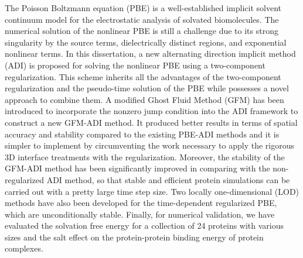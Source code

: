 The Poisson Boltzmann equation (PBE) is a well-established implicit solvent continuum model for the electrostatic analysis of solvated biomolecules. The numerical solution of the nonlinear PBE is still a challenge due to its strong singularity by the source terms, dielectrically distinct regions, and exponential nonlinear terms. In this dissertation, a new alternating direction implicit method (ADI) is proposed for solving the nonlinear PBE using a two-component regularization. This scheme inherits all the advantages of the two-component regularization and the pseudo-time solution of the PBE while possesses a novel approach to combine them. A modified Ghost Fluid Method (GFM) has been introduced to incorporate the nonzero jump condition into the ADI framework to construct a new GFM-ADI method. It produced better results in terms of  spatial accuracy and stability compared to the existing PBE-ADI methods and it is simpler to implement by circumventing the work necessary to apply the rigorous 3D interface treatments with the regularization. Moreover, the stability of the GFM-ADI method has been significantly improved in comparing with the non-regularized ADI method, so that stable and efficient protein simulations can be carried out with a pretty large time step size. Two locally one-dimensional (LOD) methods have also been developed for the time-dependent regularized PBE, which are unconditionally stable.  
Finally, for numerical validation, we have evaluated the solvation free energy for a collection of 24 proteins with various sizes and the salt effect on the protein-protein binding energy of protein complexes.